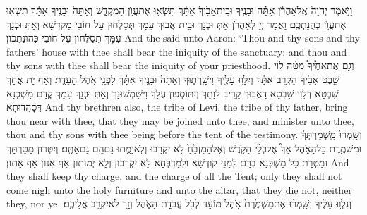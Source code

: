 \newperek
{}%
{וַיֹּ֤אמֶר יְהֹוָה֙ אֶֽל\maqqaf אַהֲרֹ֔ן אַתָּ֗ה וּבָנֶ֤יךָ וּבֵית\maqqaf אָבִ֙יךָ֙ אִתָּ֔ךְ תִּשְׂא֖וּ אֶת\maqqaf עֲוֺ֣ן הַמִּקְדָּ֑שׁ וְאַתָּה֙ וּבָנֶ֣יךָ אִתָּ֔ךְ תִּשְׂא֖וּ אֶת\maqqaf עֲוֺ֥ן כְּהֻנַּתְכֶֽם׃}
{וַאֲמַר יְיָ לְאַהֲרֹן אַתְּ וּבְנָךְ וּבֵית אֲבוּךְ עִמָּךְ תְּסַלְּחוּן עַל חוֹבֵי מַקְדְּשָׁא וְאַתְּ וּבְנָךְ עִמָּךְ תְּסַלְּחוּן עַל חוֹבֵי כְּהוּנַּתְכוֹן׃}
{And the \lord\space said unto Aaron: ‘Thou and thy sons and thy fathers’  house with thee shall bear the iniquity of the sanctuary; and thou and thy sons with thee shall bear the iniquity of your priesthood.}{}
{וְגַ֣ם אֶת\maqqaf אַחֶ֩יךָ֩ מַטֵּ֨ה לֵוִ֜י שֵׁ֤בֶט אָבִ֙יךָ֙ הַקְרֵ֣ב אִתָּ֔ךְ וְיִלָּו֥וּ עָלֶ֖יךָ וִישָֽׁרְת֑וּךָ וְאַתָּה֙ וּבָנֶ֣יךָ אִתָּ֔ךְ לִפְנֵ֖י אֹ֥הֶל הָעֵדֻֽת׃}
{וְאַף יָת אֲחָךְ שִׁבְטָא דְּלֵוִי שִׁבְטָא דַּאֲבוּךְ קָרֵיב לְוָתָךְ וְיִתּוֹסְפוּן עֲלָךְ וִישַׁמְּשׁוּנָּךְ וְאַתְּ וּבְנָךְ עִמָּךְ קֳדָם מַשְׁכְּנָא דְּסָהֲדוּתָא׃}
{And thy brethren also, the tribe of Levi, the tribe of thy father, bring thou near with thee, that they may be joined unto thee, and minister unto thee, thou and thy sons with thee being before the tent of the testimony.}{}
{וְשָֽׁמְרוּ֙ מִֽשְׁמַרְתְּךָ֔ וּמִשְׁמֶ֖רֶת כׇּל\maqqaf הָאֹ֑הֶל אַךְ֩ אֶל\maqqaf כְּלֵ֨י הַקֹּ֤דֶשׁ וְאֶל\maqqaf הַמִּזְבֵּ֙חַ֙ לֹ֣א יִקְרָ֔בוּ וְלֹֽא\maqqaf יָמֻ֥תוּ גַם\maqqaf הֵ֖ם גַּם\maqqaf אַתֶּֽם׃}
{וְיִטְּרוּן מַטַּרְתָּךְ וּמַטְּרַת כָּל מַשְׁכְּנָא בְּרַם לְמָנֵי קוּדְשָׁא וּלְמַדְבְּחָא לָא יִקְרְבוּן וְלָא יְמוּתוּן אַף אִנּוּן אַף אַתּוּן׃}
{And they shall keep thy charge, and the charge of all the Tent; only they shall not come nigh unto the holy furniture and unto the altar, that they die not, neither they, nor ye.}{}
{וְנִלְו֣וּ עָלֶ֔יךָ וְשָֽׁמְר֗וּ אֶת\maqqaf מִשְׁמֶ֙רֶת֙ אֹ֣הֶל מוֹעֵ֔ד לְכֹ֖ל עֲבֹדַ֣ת הָאֹ֑הֶל וְזָ֖ר לֹא\maqqaf יִקְרַ֥ב אֲלֵיכֶֽם׃}
